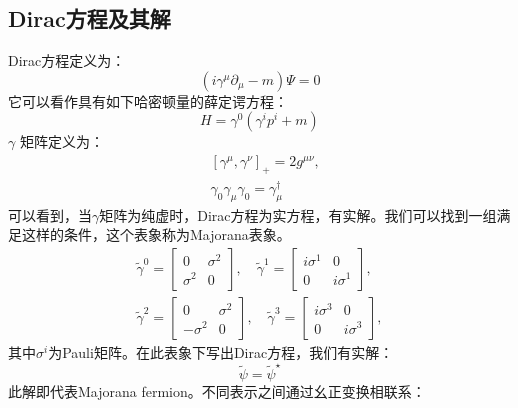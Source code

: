 \documentclass{article}
\begin{document}
\subsection{Dirac方程及其解}
Dirac方程定义为：
\begin{equation}
  \left(i \gamma^\mu \partial_\mu-m\right) \Psi=0\label{de}
\end{equation}
它可以看作具有如下哈密顿量的薛定谔方程：
\begin{equation}
  H=\gamma^0\left(\gamma^i p^i+m\right)
\end{equation}
$\gamma$ 矩阵定义为：
\begin{equation}
  \begin{aligned}
    & {\left[\gamma^\mu, \gamma^\nu\right]_{+}=2 g^{\mu \nu},} \\
    & \gamma_0 \gamma_\mu \gamma_0=\gamma_\mu^{\dagger}
    \end{aligned}
\end{equation}
可以看到，当$ \gamma $矩阵为纯虚时，Dirac方程为实方程，有实解。我们可以找到一组\gm 满足这样的条件，这个表象称为Majorana表象。
\begin{equation}
  \begin{array}{ll}
    \widetilde{\gamma}^0=\left[\begin{array}{cc}
    0 & \sigma^2 \\
    \sigma^2 & 0
    \end{array}\right], \quad \widetilde{\gamma}^1=\left[\begin{array}{cc}
    i \sigma^1 & 0 \\
    0 & i \sigma^1
    \end{array}\right], \\
    \tilde{\gamma}^2=\left[\begin{array}{cc}
    0 & \sigma^2 \\
    -\sigma^2 & 0
    \end{array}\right], \quad \tilde{\gamma}^3=\left[\begin{array}{cc}
    i \sigma^3 & 0 \\
    0 & i \sigma^3
    \end{array}\right],
    \end{array}
\end{equation}
其中$ \sigma^i $为Pauli矩阵。在此表象下写出Dirac方程，我们有实解：
\begin{equation}
  \widetilde{\psi}=\tilde{\psi}^{\star}\label{rc}
\end{equation} 
此解即代表Majorana fermion。\gm 不同表示之间通过幺正变换相联系：
\end{document}
